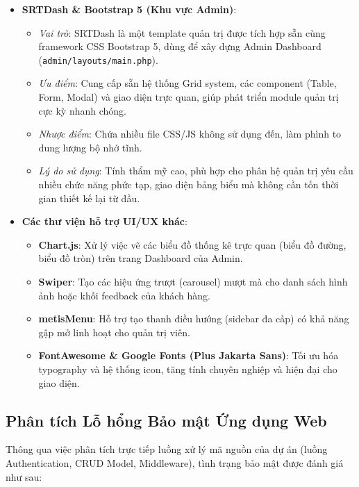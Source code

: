 \documentclass[pt = 12,a4paper]{article}
\begin{document}
\begin{itemize}
    \item \textbf{SRTDash \& Bootstrap 5 (Khu vực Admin)}:
    \begin{itemize}
        \item \textit{Vai trò}: SRTDash là một template quản trị được tích hợp sẵn cùng framework CSS Bootstrap 5, dùng để xây dựng Admin Dashboard (\texttt{admin/layouts/main.php}).
        \item \textit{Ưu điểm}: Cung cấp sẵn hệ thống Grid system, các component (Table, Form, Modal) và giao diện trực quan, giúp phát triển module quản trị cực kỳ nhanh chóng.
        \item \textit{Nhược điểm}: Chứa nhiều file CSS/JS không sử dụng đến, làm phình to dung lượng bộ nhớ tĩnh.
        \item \textit{Lý do sử dụng}: Tính thẩm mỹ cao, phù hợp cho phân hệ quản trị yêu cầu nhiều chức năng phức tạp, giao diện bảng biểu mà không cần tốn thời gian thiết kế lại từ đầu.
    \end{itemize}

    \item \textbf{Các thư viện hỗ trợ UI/UX khác}:
    \begin{itemize}
        \item \textbf{Chart.js}: Xử lý việc vẽ các biểu đồ thống kê trực quan (biểu đồ đường, biểu đồ tròn) trên trang Dashboard của Admin.
        \item \textbf{Swiper}: Tạo các hiệu ứng trượt (carousel) mượt mà cho danh sách hình ảnh hoặc khối feedback của khách hàng.
        \item \textbf{metisMenu}: Hỗ trợ tạo thanh điều hướng (sidebar đa cấp) có khả năng gập mở linh hoạt cho quản trị viên.
        \item \textbf{FontAwesome \& Google Fonts (Plus Jakarta Sans)}: Tối ưu hóa typography và hệ thống icon, tăng tính chuyên nghiệp và hiện đại cho giao diện.
    \end{itemize}
\end{itemize}

\subsection{Phân tích Lỗ hổng Bảo mật Ứng dụng Web}
Thông qua việc phân tích trực tiếp luồng xử lý mã nguồn của dự án (luồng Authentication, CRUD Model, Middleware), tình trạng bảo mật được đánh giá như sau:
\end{document}
